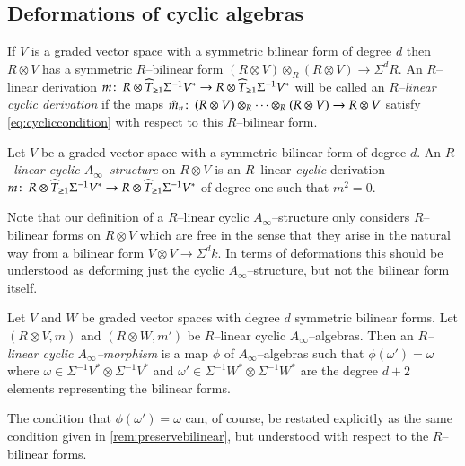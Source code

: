 \documentclass[british]{amsart}
\theoremstyle{plain}
\theoremstyle{definition}
{
\newaliascnt{{definition}}{theorem}\newtheorem{{definition}}[{definition}]{{Definition}}\aliascntresetthe{{definition}}\expandafterautorefname\endcsname{{Definition}}}
{
\newaliascnt{{remark}}{theorem}\newtheorem{{remark}}[{remark}]{{Remark}}\aliascntresetthe{{remark}}\expandafterautorefname\endcsname{{Remark}}}
{
\newaliascnt{{example}}{theorem}\newtheorem{{example}}[{example}]{{Example}}\aliascntresetthe{{example}}\expandafterautorefname\endcsname{{Example}}}
{
\newaliascnt{{examples}}{theorem}\newtheorem{{examples}}[{examples}]{{Examples}}\aliascntresetthe{{examples}}\expandafterautorefname\endcsname{{Examples}}}
{
\newaliascnt{{notation}}{theorem}\newtheorem{{notation}}[{notation}]{{Notation}}\aliascntresetthe{{notation}}\expandafterautorefname\endcsname{{Notation}}}
{
\newaliascnt{{convention}}{theorem}\newtheorem{{convention}}[{convention}]{{Convention}}\aliascntresetthe{{convention}}\expandafterautorefname\endcsname{{Convention}}}
\numberwithin{equation}{section}
\numberwithin{figure}{section}
\begin{document}
\subsection{Deformations of cyclic algebras}
If $V$ is a graded vector space with a symmetric bilinear form of degree $d$ then $R\otimes V$ has a symmetric $R$--bilinear form $(R\otimes V)\otimes_R (R\otimes V) \rightarrow \Sigma^d R$. An $R$--linear derivation $m{\colon\thinspace} R \otimes \widehat{T}_{\geq 1}\Sigma^{-1}V^*\rightarrow R \otimes \widehat{T}_{\geq 1}\Sigma^{-1}V^*$ will be called an \emph{$R$--linear cyclic derivation} if the maps $\hat{m}_n{\colon\thinspace} (R\otimes V)\otimes_R \dots \otimes_R (R\otimes V)\rightarrow R\otimes V$ satisfy \autoref{eq:cycliccondition} with respect to this $R$--bilinear form.

\begin{definition}
Let $V$ be a graded vector space with a symmetric bilinear form of degree $d$. An \emph{$R$--linear cyclic $A_\infty$--structure} on $R\otimes V$ is an $R$--linear \emph{cyclic} derivation $m{\colon\thinspace} R \otimes \widehat{T}_{\geq 1}\Sigma^{-1}V^*\rightarrow R \otimes \widehat{T}_{\geq 1}\Sigma^{-1}V^*$ of degree one such that $m^2=0$.
\end{definition}

\begin{remark}
Note that our definition of a $R$--linear cyclic $A_\infty$--structure only considers $R$--bilinear forms on $R\otimes V$ which are free in the sense that they arise in the natural way from a bilinear form $V\otimes V\rightarrow \Sigma^{d}k$. In terms of deformations this should be understood as deforming just the cyclic $A_\infty$--structure, but not the bilinear form itself.
\end{remark}

\begin{definition}
Let $V$ and $W$ be graded vector spaces with degree $d$ symmetric bilinear forms. Let $(R\otimes V,m)$ and $(R\otimes W, m')$ be $R$--linear cyclic $A_\infty$--algebras. Then an \emph{$R$--linear cyclic $A_\infty$--morphism} is a map $\phi$ of $A_\infty$--algebras such that $\phi(\omega')=\omega$ where $\omega\in\Sigma^{-1}V^*\otimes \Sigma^{-1}V^*$ and $\omega'\in\Sigma^{-1}W^*\otimes \Sigma^{-1}W^*$ are the degree $d+2$ elements representing the bilinear forms.
\end{definition}

The condition that $\phi(\omega')=\omega$ can, of course, be restated explicitly as the same condition given in \autoref{rem:preservebilinear}, but understood with respect to the $R$--bilinear forms.
\end{document}
